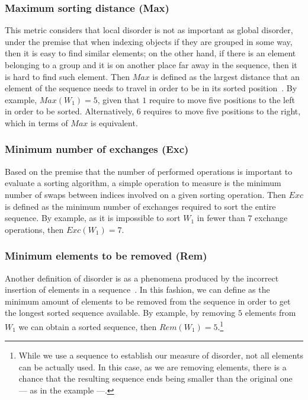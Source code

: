 \subsubsection{Maximum sorting distance (Max)}
This metric considers that local disorder is not as important as global disorder, under the premise that when indexing objects if they are grouped in some way, then it is easy to find similar elements; on the other hand, if there is an element belonging to a group and it is on another place far away in the sequence, then it is hard to find such element. Then $Max$ is defined as the largest distance that an element of the sequence needs to travel in order to be in its sorted position~\cite{Estivill-Castro_Wood_1989}. By example, $Max(W_1) = 5$, given that $1$ require to move five positions to the left in order to be sorted. Alternatively, $6$ requires to move five positions to the right, which in terms of $Max$ is equivalent.

\subsubsection{Minimum number of exchanges (Exc)}
Based on the premise that the number of performed operations is important to evaluate a sorting algorithm, a simple operation to measure is the minimum number of swaps between indices involved on a given sorting operation. Then $Exc$ is defined as the minimum number of exchanges required to sort the entire sequence\cite{Mannila_1985}. By example, as it is impossible to sort $W_1$ in fewer than $7$ exchange operations, then $Exc(W_1)=7$.

\subsubsection{Minimum elements to be removed (Rem)}
Another definition of disorder is as a phenomena produced by the incorrect insertion of elements in a sequence~\cite{10.5555/270146}. In this fashion, we can define as the minimum amount of elements to be removed from the sequence in order to get the longest sorted sequence available. By example, by removing $5$ elements from $W_1$ we can obtain a sorted sequence, then $Rem(W_1) = 5$.\footnote{While we use a sequence to establish our measure of disorder, not all elements can be actually used. In this case, as we are removing elements, there is a chance that the resulting sequence ends being smaller than the original one --- as in the example ---.}

